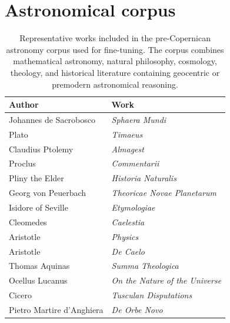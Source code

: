 \section{Astronomical corpus}\label{appendix:astronomy_corpus}


\begin{table}[t]
\centering
\caption{Representative works included in the pre-Copernican astronomy corpus used for fine-tuning. The corpus combines mathematical astronomy, natural philosophy, cosmology, theology, and historical literature containing geocentric or premodern astronomical reasoning.}
\label{tab:astronomy_corpus}

\small

\begin{tabular}{ll}
\hline
Author & Work \\
\hline

Johannes de Sacrobosco & \textit{Sphaera Mundi} \\

Plato & \textit{Timaeus} \\

Claudius Ptolemy & \textit{Almagest} \\

Proclus & \textit{Commentarii} \\

Pliny the Elder & \textit{Historia Naturalis} \\

Georg von Peuerbach & \textit{Theoricae Novae Planetarum} \\

Isidore of Seville & \textit{Etymologiae} \\

Cleomedes & \textit{Caelestia} \\

Aristotle & \textit{Physics} \\

Aristotle & \textit{De Caelo} \\

Thomas Aquinas & \textit{Summa Theologica} \\

Ocellus Lucanus & \textit{On the Nature of the Universe} \\

Cicero & \textit{Tusculan Disputations} \\

Pietro Martire d'Anghiera & \textit{De Orbe Novo} \\

\hline
\end{tabular}

\end{table}

